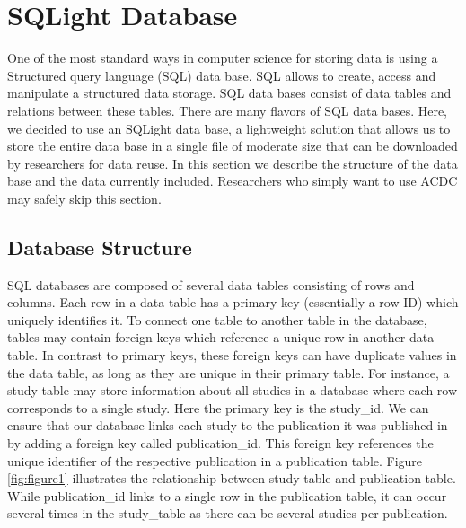 \documentclass[
  man,floatsintext]{apa6}
\begin{document}
\hypertarget{sqlight-database}{%
\section{SQLight Database}\label{sqlight-database}}

One of the most standard ways in computer science for storing data is using a Structured query language (SQL) data base. SQL allows to create, access and manipulate a structured data storage. SQL data bases consist of data tables and relations between these tables. There are many flavors of SQL data bases. Here, we decided to use an SQLight data base, a lightweight solution that allows us to store the entire data base in a single file of moderate size that can be downloaded by researchers for data reuse. In this section we describe the structure of the data base and the data currently included. Researchers who simply want to use ACDC may safely skip this section.

\hypertarget{database-structure}{%
\subsection{Database Structure}\label{database-structure}}

SQL databases are composed of several data tables consisting of rows and columns. Each row in a data table has a primary key (essentially a row ID) which uniquely identifies it. To connect one table to another table in the database, tables may contain foreign keys which reference a unique row in another data table. In contrast to primary keys, these foreign keys can have duplicate values in the data table, as long as they are unique in their primary table. For instance, a study table may store information about all studies in a database where each row corresponds to a single study. Here the primary key is the study\_id. We can ensure that our database links each study to the publication it was published in by adding a foreign key called publication\_id. This foreign key references the unique identifier of the respective publication in a publication table. Figure \ref{fig:figure1} illustrates the relationship between study table and publication table. While publication\_id links to a single row in the publication table, it can occur several times in the study\_table as there can be several studies per publication.
\end{document}
